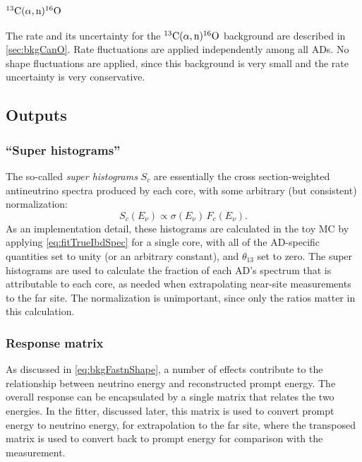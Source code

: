 \documentclass[../thesis.tex]{subfiles}
\begin{document}
\subsubsection{$^{13}\mathrm{C}(\alpha, \mathrm{n})^{16}\mathrm{O}$}

The rate and its uncertainty for the $^{13}\mathrm{C}(\alpha, \mathrm{n})^{16}\mathrm{O}$ background are described in \autoref{sec:bkgCanO}. Rate fluctuations are applied independently among all ADs. No shape fluctuations are applied, since this background is very small and the rate uncertainty is very conservative.

\subsection{Outputs}
\label{sec:fitToyOutputs}

\subsubsection{``Super histograms''}

The so-called \emph{super histograms} $S_c$ are essentially the cross section-weighted antineutrino spectra produced by each core, with some arbitrary (but consistent) normalization:
\begin{equation*}
  S_c(E_\nu) \propto \sigma(E_\nu)\,F_c(E_\nu).
\end{equation*}
As an implementation detail, these histograms are calculated in the toy MC by applying \autoref{eq:fitTrueIbdSpec} for a single core, with all of the AD-specific quantities set to unity (or an arbitrary constant), and $\theta_{13}$ set to zero. The super histograms are used to calculate the fraction of each AD's spectrum that is attributable to each core, as needed when extrapolating near-site measurements to the far site. The normalization is unimportant, since only the ratios matter in this calculation.

\subsubsection{Response matrix}

As discussed in \autoref{eq:bkgFastnShape}, a number of effects contribute to the relationship between neutrino energy and reconstructed prompt energy. The overall response can be encapsulated by a single matrix that relates the two energies. In the fitter, discussed later, this matrix is used to convert prompt energy to neutrino energy, for extrapolation to the far site, where the transposed matrix is used to convert back to prompt energy for comparison with the measurement.
\end{document}
